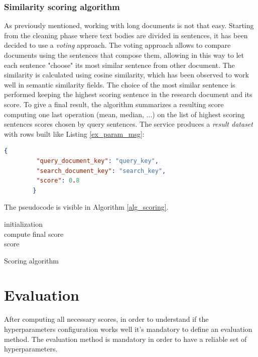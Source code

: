 \documentclass[\main/main.tex]{subfiles}
\begin{document}
\subsubsection{Similarity scoring algorithm}
As previously mentioned, working with long documents is not that easy. Starting from the cleaning phase where text bodies are divided in sentences, it has been decided to use a \emph{voting} approach. The voting approach allows to compare documents using the sentences that compose them, allowing in this way to let each sentence "choose" its most similar sentence from other document. The similarity is calculated using cosine similarity, which has been observed to work well in semantic similarity fields. The choice of the most similar sentence is performed keeping the highest scoring sentence in the research document and its score. To give a final result, the algorithm summarizes a resulting score computing one last operation (mean, median, ...) on the list of highest scoring sentences scores chosen by query sentences. The service produces a \emph{result dataset} with rows built like Listing \ref{ex_param_msg}:
\\
\begin{center}
    \begin{lstlisting}[language=json, caption="Parameter message example", captionpos=b, label={ex_param_msg}]
        {
         "query_document_key": "query_key",
         "search_document_key": "search_key",
         "score": 0.8
        }
    \end{lstlisting}
\end{center}
The pseudocode is visible in Algorithm \ref{alg_scoring}.
\begin{center}
    \begin{algorithm}[H]
     initialization\\
     compute final score\\
     \Return score
     \caption{Scoring algorithm}
     \label{alg_scoring}
    \end{algorithm}
\end{center}

\section{Evaluation} 
After computing all necessary scores, in order to understand if the hyperparameters configuration works well it's mandatory to define an evaluation method. The evaluation method is mandatory in order to have a reliable set of hyperparameters. \\
\end{document}
